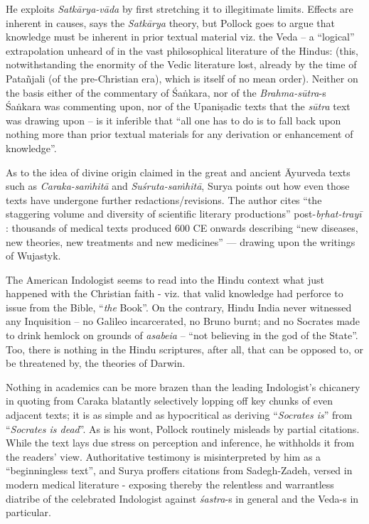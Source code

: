 He exploits {\sl Satkārya-vāda} by first stretching it to illegitimate limits. Effects are inherent in causes, says the {\sl Satkārya} theory, but Pollock goes to argue that knowledge must be inherent in prior textual material viz. the Veda -- a “logical” extrapolation unheard of in the vast philosophical literature of the Hindus: (this, notwithstanding the enormity of the Vedic literature lost, already by the time of Patañjali (of the pre-Christian era), which is itself of no mean order). Neither on the basis either of the commentary of Śaṅkara, nor of the \hbox{{\sl Brahma-sūtra}-s} Śaṅkara was commenting upon, nor of the Upaniṣadic texts that the {\sl sūtra} text was drawing upon -- is it inferible that “all one has to do is to fall back upon nothing more than prior textual materials for any derivation or enhancement of knowledge”.
\vskip 3pt

As to the idea of divine origin claimed in the great and ancient Āyurveda texts such as {\sl Caraka-saṁhitā} and {\sl Suśruta-saṁhitā}, Surya points out how even those texts have undergone further redactions/revisions. The author cites “the staggering volume and diversity of scientific literary productions” post-{\sl bṛhat-trayī} : thousands of medical texts produced 600 CE onwards describing “new diseases, new theories, new treatments and new medicines” --- drawing upon the writings of Wujastyk.
\vskip 3pt

The American Indologist seems to read into the Hindu context what just happened with the Christian faith - viz. that valid knowledge had perforce to issue from the Bible, “{\sl the} Book”. On the contrary, Hindu India never witnessed any Inquisition -- no Galileo incarcerated, no Bruno burnt; and no Socrates made to drink hemlock on grounds of {\sl asabeia} -- “not believing in the god of the State”. Too, there is nothing in the Hindu scriptures, after all, that can be opposed to, or be threatened by, the theories of Darwin.

Nothing in academics can be more brazen than the leading Indologist’s chicanery in quoting from Caraka blatantly selectively lopping off key chunks of even adjacent texts; it is as simple and as hypocritical as deriving “{\sl Socrates is}” from “{\sl Socrates is dead}”. As is his wont, Pollock routinely misleads by partial citations. While the text lays due stress on perception and inference, he withholds it from the readers’ view. Authoritative testimony is misinterpreted by him as a “beginningless text”, and Surya proffers citations from Sadegh-Zadeh, versed in modern medical literature - exposing thereby the relentless and warrantless diatribe of the celebrated Indologist against {\sl śastra}-s in general and the Veda-s in particular.
\vskip 8pt

